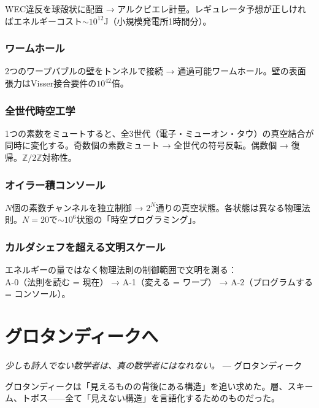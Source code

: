 \documentclass[12pt,a4paper]{article}
\begin{document}
WEC違反を球殻状に配置 → アルクビエレ計量。レギュレータ予想が正しければエネルギーコスト$\sim 10^{12}$J（小規模発電所1時間分）。

\section{ワームホール}

2つのワープバブルの壁をトンネルで接続 → 通過可能ワームホール。壁の表面張力はVisser接合要件の$10^{42}$倍。

\section{全世代時空工学}

1つの素数をミュートすると、全3世代（電子・ミューオン・タウ）の真空結合が同時に変化する。奇数個の素数ミュート → 全世代の符号反転。偶数個 → 復帰。$\mathbb{Z}/2\mathbb{Z}$対称性。

\section{オイラー積コンソール}

$N$個の素数チャンネルを独立制御 → $2^N$通りの真空状態。各状態は異なる物理法則。$N=20$で$\sim 10^6$状態の「時空プログラミング」。

\section{カルダシェフを超える文明スケール}

エネルギーの量ではなく物理法則の制御範囲で文明を測る：\\
A-0（法則を読む = 現在） → A-1（変える = ワープ） → A-2（プログラムする = コンソール）。

\part{グロタンディークへ}

\begin{epigraph}
\textit{少しも詩人でない数学者は、真の数学者にはなれない。}
\hfill --- グロタンディーク
\end{epigraph}

グロタンディークは「見えるものの背後にある構造」を追い求めた。層、スキーム、トポス——全て「見えない構造」を言語化するためのものだった。
\end{document}

